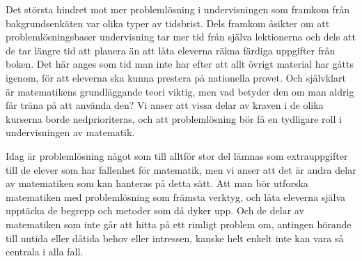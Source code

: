 \textcolor{lila}{Det största hindret mot mer problemlösning i undervisningen som framkom från bakgrundsenkäten var olika typer av tidsbrist. Dels framkom åsikter om att problemlösningsbaser undervisning tar mer tid från själva lektionerna och dels att de tar längre tid att planera än att låta eleverna räkna färdiga uppgifter från boken. Det här anges som tid man inte har efter att allt övrigt material har gåtts igenom, för att eleverna ska kunna prestera på nationella provet. Och självklart är matematikens grundläggande teori viktig, men vad betyder den om man aldrig får träna på att använda den? Vi anser att vissa delar av kraven i de olika kurserna borde nedprioriteras, och att problemlösning bör få en tydligare roll i undervisningen av matematik.} 

\textcolor{lila}{Idag är problemlösning något som till alltför stor del lämnas som extrauppgifter till de elever som har fallenhet för matematik, men vi anser att det är andra delar av matematiken som kan hanteras på detta sätt. Att man bör utforska matematiken med problemlösning som främsta verktyg, och låta eleverna själva upptäcka de begrepp och metoder som då dyker upp. Och de delar av matematiken som inte går att hitta på ett rimligt problem om, antingen hörande till nutida eller dåtida behov eller intressen, kanske helt enkelt inte kan vara så centrala i alla fall.}